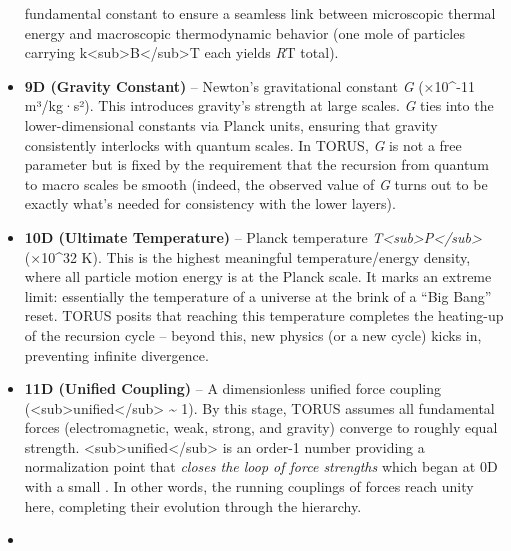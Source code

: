 \documentclass[
]{article}
\begin{document}
\begin{itemize}
  fundamental constant to ensure a seamless link between microscopic
  thermal energy and macroscopic thermodynamic behavior (one mole of
  particles carrying
  k\textless sub\textgreater B\textless/sub\textgreater T each yields
  \emph{R}T total)\hspace{0pt}.
\item
  \textbf{9D (Gravity Constant)} -- Newton's gravitational constant
  \emph{G} (×10\^{}-11 m³/kg·s²)\hspace{0pt}. This introduces
  gravity's strength at large scales. \emph{G} ties into the
  lower-dimensional constants via Planck units, ensuring that gravity
  consistently interlocks with quantum scales\hspace{0pt}. In TORUS,
  \emph{G} is not a free parameter but is fixed by the requirement that
  the recursion from quantum to macro scales be smooth (indeed, the
  observed value of \emph{G} turns out to be exactly what's needed for
  consistency with the lower layers)\hspace{0pt}.
\item
  \textbf{10D (Ultimate Temperature)} -- Planck temperature
  \emph{T\textless sub\textgreater P\textless/sub\textgreater{}} (×10\^{}32 K)\hspace{0pt}. This is the highest meaningful
  temperature/energy density, where all particle motion energy is at the
  Planck scale. It marks an extreme limit: essentially the temperature
  of a universe at the brink of a ``Big Bang'' reset. TORUS posits that
  reaching this temperature completes the heating-up of the recursion
  cycle\hspace{0pt} -- beyond this, new physics (or a new cycle) kicks
  in, preventing infinite divergence.
\item
  \textbf{11D (Unified Coupling)} -- A dimensionless unified force
  coupling
  (\alpha\textless sub\textgreater unified\textless/sub\textgreater{}
  \textasciitilde{} 1)\hspace{0pt}. By this stage, TORUS assumes all
  fundamental forces (electromagnetic, weak, strong, and gravity)
  converge to roughly equal strength.
  \alpha\textless sub\textgreater unified\textless/sub\textgreater{} is an
  order-1 number providing a normalization point that \emph{closes the
  loop of force strengths} which began at 0D with a small \alpha. In other
  words, the running couplings of forces reach unity here, completing
  their evolution through the hierarchy\hspace{0pt}.
\item

\end{itemize}
\end{document}
